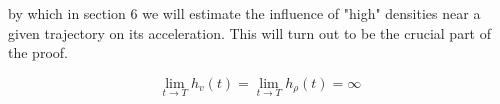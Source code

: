 by which in section 6 we will estimate the influence of "high" densities near a given trajectory on its acceleration. This will turn out to be the crucial part of the proof.

\begin{assumption}
  \[
  \lim _{t \rightarrow T} h_{v}(t)=\lim _{t \rightarrow T} h_{\rho}(t)=\infty
  \]
\end{assumption}

